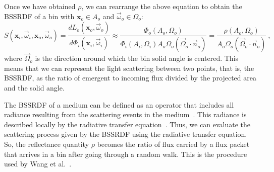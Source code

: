 \documentclass[10pt,a4paper]{article}
\newcommand{\x}{\mathbf{x}}
\newcommand{\vomega}{\vec{\omega}}
\begin{document}
Once we have obtained $\rho$, we can rearrange the above equation to obtain the BSSRDF of a bin with $\x_o \in A_o$ and $\vomega_o \in \Omega_o$:
%
\begin{equation}
S(\x_i, \vomega_i, \x_o, \vomega_o) = \frac{d L_o(\x_o, \vomega_o)}{d\Phi_i(\x_i, \vomega_i)} \approx \frac{\Phi_o(A_o, \Omega_o)}{\Phi_i(A_i, \Omega_i) A_o \Omega_o (\vec{\Omega}_o \cdot \vec{n}_o)} = \frac{\rho(A_o, \Omega_o)}{ A_o \Omega_o (\vec{\Omega}_o \cdot \vec{n}_o)} \ ,
\label{eq:bssrdf}
\end{equation}
%
where $\vec{\Omega}_o$ is the direction around which the bin solid angle is centered. This means that we can represent the light scattering between two points, that is, the BSSRDF, as the ratio of emergent to incoming flux divided by the projected area and the solid angle.

The BSSRDF of a medium can be defined as an operator that includes all radiance resulting from the scattering events in the medium~\citep{preisendorfer65}. This radiance is described locally by the radiative transfer equation~\citep{preisendorfer65}. Thus, we can evaluate the scattering process given by the BSSRDF using the radiative transfer equation. So, the reflectance quantity $\rho$ becomes the ratio of flux carried by a flux packet that arrives in a bin after going through a random walk. This is the procedure used by Wang et al.~\cite{wang1995}.
\end{document}

